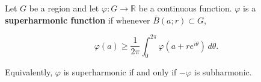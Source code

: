 Let $G$ be a region and let $\varphi: G \to \mathbb{R}$ be a continuous function. $\varphi$ is a \textbf{superharmonic function} if whenever $\bar{B}(a; r) \subset G$,

$$\varphi(a) \geq \frac{1}{2\pi} \int_{0}^{2\pi} \varphi(a + re^{i\theta}) \, d\theta.$$

Equivalently, $\varphi$ is superharmonic if and only if $-\varphi$ is subharmonic.
